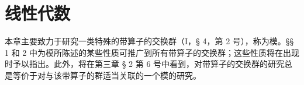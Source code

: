 \chapter{线性代数}

本章主要致力于研究一类特殊的带算子的交换群（I，§ 4，第 2 号），称为模。§§ 1 和 2 中为模所陈述的某些性质可推广到所有带算子的交换群；这些性质将在出现时予以指出。此外，将在第三章 § 2 第 6 号中看到，对带算子的交换群的研究总是等价于对与该带算子的群适当关联的一个模的研究。

